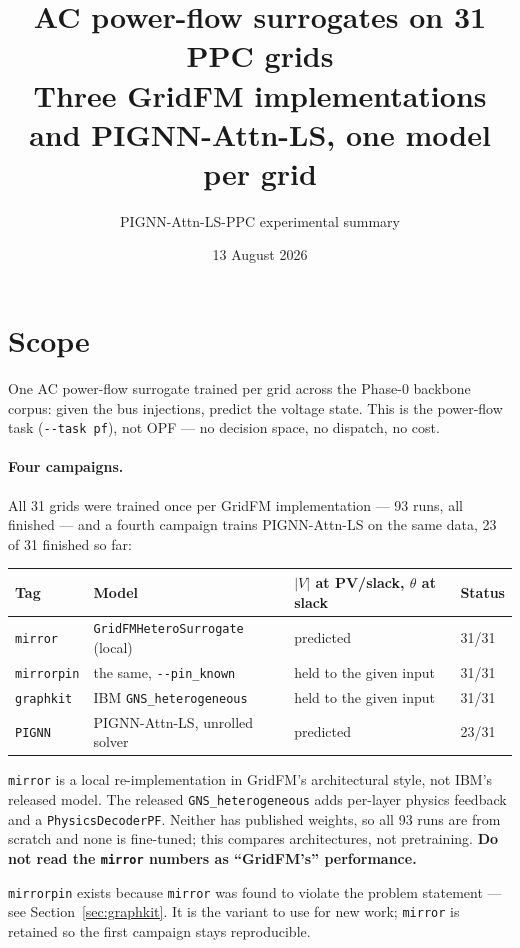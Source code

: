 \documentclass[10pt]{article}
\title{AC power-flow surrogates on 31 PPC grids\\
\large Three GridFM implementations and PIGNN-Attn-LS, one model per grid}
\author{PIGNN-Attn-LS-PPC experimental summary}
\date{13 August 2026}
\begin{document}
\maketitle

\section{Scope}

One AC power-flow surrogate trained per grid across the Phase-0 backbone corpus:
given the bus injections, predict the voltage state. This is the power-flow task
(\texttt{-{}-task pf}), not OPF --- no decision space, no dispatch, no cost.

\paragraph{Four campaigns.} All 31 grids were trained once per GridFM
implementation --- 93 runs, all finished --- and a fourth campaign trains
PIGNN-Attn-LS on the same data, 23 of 31 finished so far:

\begin{table}[H]
\centering
\small
\begin{tabular}{llll}
\toprule
Tag & Model & $|V|$ at PV/slack, $\theta$ at slack & Status \\
\midrule
\texttt{mirror}    & \texttt{GridFMHeteroSurrogate} (local) & predicted & 31/31 \\
\texttt{mirrorpin} & the same, \texttt{-{}-pin\_known}      & held to the given input & 31/31 \\
\texttt{graphkit}  & IBM \texttt{GNS\_heterogeneous}        & held to the given input & 31/31 \\
\texttt{PIGNN}     & PIGNN-Attn-LS, unrolled solver         & predicted & 23/31 \\
\bottomrule
\end{tabular}
\end{table}

\texttt{mirror} is a local re-implementation in GridFM's architectural style,
not IBM's released model. The released \texttt{GNS\_heterogeneous} adds
per-layer physics feedback and a \texttt{PhysicsDecoderPF}. Neither has
published weights, so all 93 runs are from scratch and none is fine-tuned;
this compares architectures, not pretraining. \textbf{Do not read the
\texttt{mirror} numbers as ``GridFM's'' performance.}

\texttt{mirrorpin} exists because \texttt{mirror} was found to violate the
problem statement --- see Section~\ref{sec:graphkit}. It is the variant to use
for new work; \texttt{mirror} is retained so the first campaign stays
reproducible.
\end{document}
